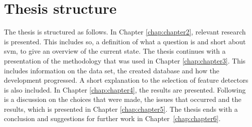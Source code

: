 \section{Thesis structure}
\label{sec:thesis_structure}
The thesis is structured as follows. In Chapter \ref{chap:chapter2}, relevant research is presented. 
This includes \gls{so}, a definition of what a question is and short about \gls{svm}, to give an overview of the current state. 
The thesis continues with a presentation of the methodology that was used in Chapter \ref{chap:chapter3}. 
This includes information on the data set, the created database and how the development progressed. 
A short explanation to the selection of feature detectors is also included. 
In Chapter \ref{chap:chapter4}, the results are presented.
Following is a discussion on the choices that were made, the issues that occurred and the results, which is presented in Chapter \ref{chap:chapter5}.
The thesis ends with a conclusion and suggestions for further work in Chapter~\ref{chap:chapter6}.

